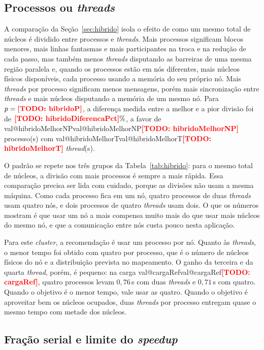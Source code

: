 \documentclass[11pt,a4paper]{article}
\makeatletter
\newcommand{\TODO}[1]{\textcolor{red}{\textbf{[TODO: #1]}}}
\newcommand{\pct}{\%}
\newcommand{\Valor}[1]{\ifcsname val@#1\endcsname\csname val@#1\endcsname\else\TODO{#1}\fi}
\makeatother
\begin{document}
\subsection{Processos ou \emph{threads}}

A comparação da Seção~\ref{sec:hibrido} isola o efeito de como um mesmo total de núcleos é dividido entre processos e \emph{threads}. Mais processos significam blocos menores, mais linhas fantasmas e mais participantes na troca e na redução de cada passo, mas também menos \emph{threads} disputando as barreiras de uma mesma região paralela e, quando os processos estão em nós diferentes, mais núcleos físicos disponíveis, cada processo usando a memória do seu próprio nó. Mais \emph{threads} por processo significam menos mensagens, porém mais sincronização entre \emph{threads} e mais núcleos disputando a memória de um mesmo nó. Para $p = \Valor{hibridoP}$, a diferença medida entre a melhor e a pior divisão foi de $\Valor{hibridoDiferencaPct}\pct$, a favor de \Valor{hibridoMelhorNP} processo(s) com \Valor{hibridoMelhorT} \emph{thread}(s).

O padrão se repete nos três grupos da Tabela~\ref{tab:hibrido}: para o mesmo total de núcleos, a divisão com mais processos é sempre a mais rápida. Essa comparação precisa ser lida com cuidado, porque as divisões não usam a mesma máquina. Como cada processo fica em um nó, quatro processos de duas \emph{threads} usam quatro nós, e dois processos de quatro \emph{threads} usam dois. O que os números mostram é que usar um nó a mais compensa muito mais do que usar mais núcleos do mesmo nó, e que a comunicação entre nós custa pouco nesta aplicação.

Para este \emph{cluster}, a recomendação é usar um processo por nó. Quanto às \emph{threads}, o menor tempo foi obtido com quatro por processo, que é o número de núcleos físicos do nó e a distribuição prevista no mapeamento. O ganho da terceira e da quarta \emph{thread}, porém, é pequeno: na carga \Valor{cargaRef}, quatro processos levam $0{,}76$\,s com duas \emph{threads} e $0{,}71$\,s com quatro. Quando o objetivo é o menor tempo, vale usar as quatro. Quando o objetivo é aproveitar bem os núcleos ocupados, duas \emph{threads} por processo entregam quase o mesmo tempo com metade dos núcleos.

\subsection{Fração serial e limite do \emph{speedup}}
\end{document}
